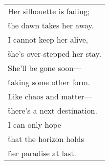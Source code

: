 \documentclass{article}
\begin{document}
\begin{center}
\begin{tabular}{l}
Her silhouette is fading; \\
\h the dawn takes her away. \\
I cannot keep her alive, \\
\h she's over-stepped her stay. \\
She'll be gone soon--- \\
\h taking some other form. \\
Like chaos and matter--- \\
\h there's a next destination. \\
I can only hope \\
\h that the horizon holds \\
\h\h her paradise at last. \\
\end{tabular}
%
%
%
%
%

\end{center}
\end{document}
